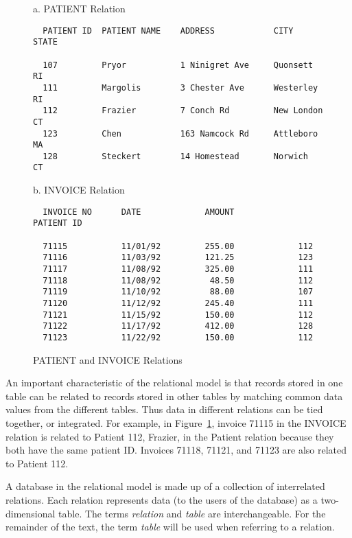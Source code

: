 \begin{figure}
\caption{PATIENT and INVOICE Relations}{\label{fig:PatInvRel}}
\begin{screen}
a. PATIENT Relation
\begin{verbatim}
  PATIENT ID  PATIENT NAME    ADDRESS            CITY         STATE

  107         Pryor           1 Ninigret Ave     Quonsett     RI
  111         Margolis        3 Chester Ave      Westerley    RI
  112         Frazier         7 Conch Rd         New London   CT
  123         Chen            163 Namcock Rd     Attleboro    MA
  128         Steckert        14 Homestead       Norwich      CT
\end{verbatim}
\end{screen}
\begin{screen}
b. INVOICE Relation
\begin{verbatim}
  INVOICE NO      DATE             AMOUNT             PATIENT ID

  71115           11/01/92         255.00             112
  71116           11/03/92         121.25             123
  71117           11/08/92         325.00             111
  71118           11/08/92          48.50             112
  71119           11/10/92          88.00             107
  71120           11/12/92         245.40             111
  71121           11/15/92         150.00             112
  71122           11/17/92         412.00             128
  71123           11/22/92         150.00             112
\end{verbatim}
\end{screen}
\end{figure}

An important characteristic of the relational model is that records
stored in one table can be related to records stored in other tables
by matching common data values from the different tables.  Thus data
in different relations can be tied together, or integrated.  For
example, in Figure~\ref{fig:PatInvRel}, invoice 71115 in the INVOICE
relation is related to Patient 112, Frazier, in the Patient relation
because they both have the same patient ID.  Invoices 71118, 71121,
and 71123 are also related to Patient 112.

A database in the relational model is made up of a collection of
interrelated relations.  Each relation represents data (to the users
of the database) as a two-dimensional table.  The terms {\em relation}
and {\em table} are interchangeable.  For the remainder of the text,
the term {\em table} will be used when referring to a relation.

